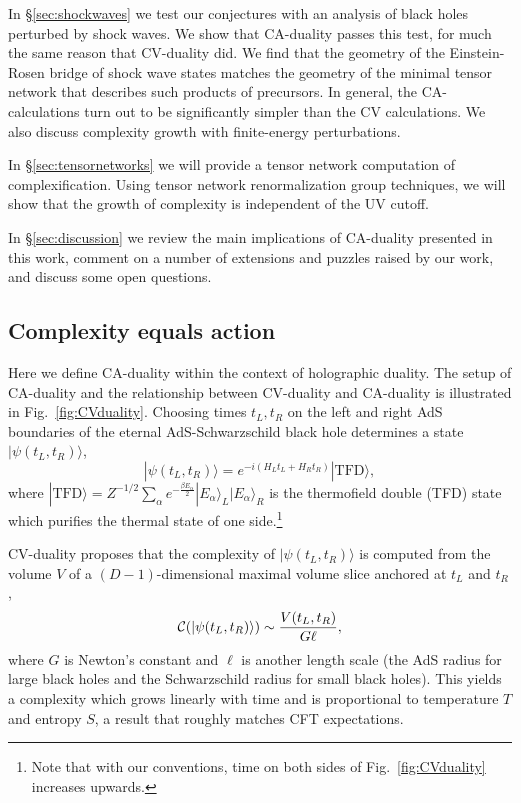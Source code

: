 \documentclass[12pt]{article}
\numberwithin{equation}{section}
\newcommand{\beq}{\begin{equation}}
\newcommand{\eeq}{\end{equation}}
\def\CC{{\cal C}}
\newcommand{\ket}[1]{| #1 \rangle }
\newcommand{\TFD}{|\text{TFD}\rangle}
\begin{document}
In \S\ref{sec:shockwaves} we test our conjectures with an analysis of black holes perturbed by shock waves. We show that CA-duality passes this test, for much the same reason that CV-duality did. We find that the geometry of the Einstein-Rosen bridge of shock wave states matches the geometry of the minimal tensor network that describes such products of precursors. In general, the CA-calculations turn out to be significantly simpler than the CV calculations. We also discuss {complexity growth with} finite-energy {perturbations}.

In \S\ref{sec:tensornetworks} we will provide a tensor network computation of complexification. %
Using tensor network renormalization group techniques, we will show that the growth of complexity is independent of the UV cutoff.



In \S\ref{sec:discussion} we review the main implications of CA-duality presented in this work, comment on a number of extensions and puzzles raised by our work, and discuss some open questions.

\subsection{Complexity equals action}
\label{subsec:CA}

Here we define  CA-duality  within the context of holographic duality. The setup of CA-duality and the relationship between CV-duality and CA-duality is illustrated in Fig.~\ref{fig:CVduality}. Choosing times $t_L , t_R$ on the left and right AdS boundaries of
 the eternal AdS-Schwarzschild black hole determines a state $\ket{\psi(t_L,t_R)}$,
\beq
\ket{\psi(t_L,t_R)} = e^{-i (H_L t_L + H_R t_R)} \TFD,
\eeq
where $\TFD = Z^{-1/2} \sum_\alpha e^{-\frac{\beta E_\alpha}{2} } \ket{E_\alpha}_L\ket{E_\alpha}_R$ is the thermofield double (TFD) state which purifies the thermal state of one side.\footnote{Note that with our conventions, time on both sides of Fig.~\ref{fig:CVduality} increases upwards.}

CV-duality proposes that the complexity of $\ket{\psi(t_L,t_R)}$ is computed from the volume $V$ of a $(D-1)$-dimensional maximal volume slice anchored at $t_L$ and $t_R$,
\beq
\CC(\ket{\psi(t_L,t_R)})
 \sim
\frac{V(t_L,t_R)}{G \ell},
\label{old}
\eeq
where $G$ is Newton's constant and $\ell$ is another length scale (the AdS radius for large black holes and the Schwarzschild radius for small black holes). This yields a complexity which grows linearly with time and is proportional to temperature $T$ and entropy $S$, a result that roughly matches CFT expectations.
\end{document}

